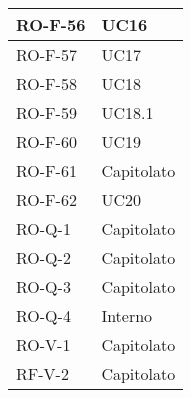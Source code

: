 \begin{center}
\begin{tabular}{ |m{8em}|m{13em}| }
    \hline
    RO-F-56  &  UC16 \\
    \hline
    RO-F-57  &  UC17 \\
    \hline
    RO-F-58  &  UC18 \\
    \hline
    RO-F-59  &  UC18.1 \\
    \hline
    RO-F-60  &  UC19 \\
    \hline
    RO-F-61  &  Capitolato \\
    \hline
    RO-F-62  &  UC20 \\
    \hline
    RO-Q-1  &  Capitolato \\
    \hline
    RO-Q-2  &  Capitolato \\
    \hline
    RO-Q-3  &  Capitolato \\
    \hline
    RO-Q-4  &  Interno \\
    \hline
    RO-V-1  &  Capitolato \\
    \hline
    RF-V-2  &  Capitolato \\
    \hline
\end{tabular}
\end{center}